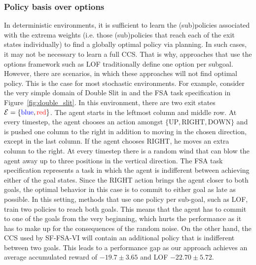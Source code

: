 \subsubsection{Policy basis over options} In deterministic environments, it is sufficient to learn the (sub)policies associated with the extrema weights (i.e. those (sub)policies that reach each of the exit states individually) to find a globally optimal policy via planning. In such cases, it may not be necessary to learn a full CCS. That is why, approaches that use the options framework such as LOF traditionally define one option per subgoal. However, there are scenarios, in which these approaches will not find optimal policy. This is the case for most stochastic environments. For example, consider the very simple domain of Double Slit in and the FSA task specification in Figure~\ref{fig:double_slit}. In this environment, there are two exit states $\mathcal{E}=\{{\color{blue} \text{blue}}, {\color{red}\text{red}}\}$. The agent starts in the leftmost column and middle row. At every timestep, the agent chooses an action amongst $\{\text{UP}, \text{RIGHT}, \text{DOWN}\}$ and is pushed one column to the right in addition to moving in the chosen direction, except in the last column. If the agent chooses RIGHT, he moves an extra column to the right. At every timestep there is a random wind that can blow the agent away up to three positions in the vertical direction. The FSA task specification represents a task in which the agent is indifferent between achieving either of the goal states. Since the RIGHT action brings the agent closer to both goals, the optimal behavior in this case is to commit to either goal as late as possible. In this setting, methods that use one policy per sub-goal, such as LOF, train two policies to reach both goals. This means that the agent has to commit to one of the goals from the very beginning, which hurts the performance as it has to make up for the consequences of the random noise. On the other hand, the CCS used by SF-FSA-VI will contain an additional policy that is indifferent between two goals. This leads to a performance gap as our approach achieves an average accumulated reward of $-19.7\pm3.65$ and LOF $-22.70\pm 5.72$.

%     
%     

